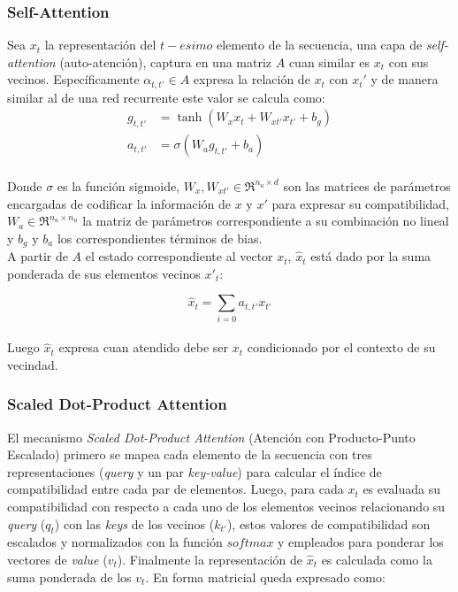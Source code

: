 	\subsubsection{Self-Attention}
	
		Sea $x_t$ la representación del $t-esimo$ elemento de la secuencia, una capa de \textit{self-attention} (auto-atención), captura en una matriz $A$ cuan similar es $x_t$ con sus vecinos. Específicamente $\alpha_{t, t'} \in A$ expresa la relación de $x_t$ con $x_t'$ y de manera similar al de una red recurrente este valor se calcula como:
		\begin{equation}
			\begin{split}
				g_{t, t'} &= \tanh(W_{x}x_t + W_{x{t'}}x_{t'} + b_g)\\
				a_{t, t'} &= \sigma({W_{a}g_{t, t'} + b_{a}}) 
			\end{split}
		\end{equation}
		\\
		Donde $\sigma$ es la función sigmoide, $W_{x}, W_{x{t'}} \in \Re^{n_u \times d} $ son las matrices de parámetros encargadas de codificar la información de $x \text{ y } x'$ para expresar su compatibilidad, $W_a \in \Re^{n_u \times n_u}$ la matriz de parámetros correspondiente a su combinación no lineal y $b_g \text{ y } b_a$ los correspondientes términos de bias.
		\\
		A partir de $A$ el estado correspondiente al vector $x_t$, $\hat{x}_t$ está dado por la suma ponderada de sus elementos vecinos $x'_t$:
		
		\begin{equation} \label{attention}
			\hat{x}_t = \sum \limits_{i=0} a_{t,t'}x_{t'}
		\end{equation}
		\\
		Luego $\hat{x}_t$ expresa cuan atendido debe ser $x_t$ condicionado por el contexto de su vecindad.
	
	\subsubsection{Scaled Dot-Product Attention}
		
		El mecanismo \textit{Scaled Dot-Product Attention} (Atención con Producto-Punto Escalado) primero se mapea cada elemento de la secuencia con tres representaciones (\textit{query} y un par \textit{key-value}) para calcular el índice de compatibilidad entre cada par de elementos. Luego, para cada $x_t$ es evaluada su compatibilidad con respecto a cada uno de los  elementos vecinos relacionando su \textit{query} ($q_t$) con las \textit{keys} de los vecinos ($k_{t'}$), estos valores de compatibilidad son escalados y normalizados con la función $softmax$ y empleados para ponderar los vectores de \textit{value} ($v_t$). Finalmente la representación de $\hat{x}_t$ es calculada como la suma ponderada de los $v_t$. En forma matricial queda expresado como:
		
